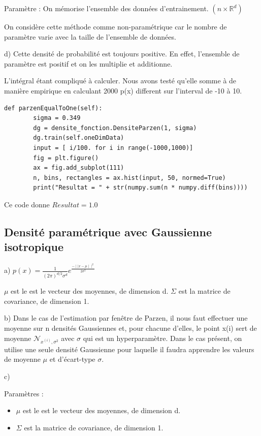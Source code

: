 \documentclass[a4paper,10pt]{article}
\begin{document}
Paramètre : On mémorise l'ensemble des données d'entrainement. $( n \times \mathds{R}^{d})$

On considère cette méthode comme non-paramétrique car le nombre de paramètre varie avec la taille de l'ensemble de données.



d)
Cette densité de probabilité est toujours positive. En effet, l'ensemble de paramètre est positif et on les multiplie et additionne. 

L'intégral étant compliqué à calculer. Nous avons testé qu'elle somme à de manière empirique en calculant 2000 p(x) different sur l'interval de -10 à 10.

\begin{verbatim}
def parzenEqualToOne(self):
        sigma = 0.349
        dg = densite_fonction.DensiteParzen(1, sigma)
        dg.train(self.oneDimData)
        input = [ i/100. for i in range(-1000,1000)]
        fig = plt.figure()
        ax = fig.add_subplot(111)
        n, bins, rectangles = ax.hist(input, 50, normed=True)
        print("Resultat = " + str(numpy.sum(n * numpy.diff(bins))))
\end{verbatim}

Ce code donne $Resultat = 1.0$

\subsection{Densité paramétrique avec Gaussienne isotropique}

a) $p(x) = \frac{1}{(2 \pi)^{d/2} \sigma^{d}} e^{\frac{-\mid\mid x- \mu \mid\mid ^{2}}{2 \sigma^{2}} }$


$\mu$ est le est le vecteur des moyennes, de dimension d.
$\Sigma$ est la matrice de covariance, de dimension 1.



b) Dans le cas de l'estimation par fenêtre de Parzen, il nous faut effectuer une moyenne sur n densités Gaussiennes et, pour chacune d'elles, le point x(i) sert de moyenne $\mathcal{N}_{x^{(i)}, \sigma^{2}}$ avec $\sigma$ qui est un hyperparamètre. Dans le cas présent, on utilise une seule densité Gaussienne pour laquelle il faudra apprendre les valeurs de moyenne $\mu$ et d'écart-type $\sigma$.

c)

Paramètres :
\begin{itemize}
	\item $\mu$ est le est le vecteur des moyennes, de dimension d.
	\item $\Sigma$ est la matrice de covariance, de dimension 1.
\end{itemize}
\end{document}
